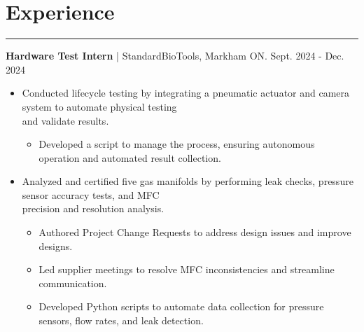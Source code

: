 \documentclass{article}
\begin{document}
\vspace{-0.5cm}     
\section*{\hspace{0.2cm} \large Experience}
\begin{center}
    \vspace{-0.5cm}
    \rule{\textwidth}{0.1pt}
\end{center}

\vspace{0cm}
\textbf{\hspace{-0.10cm} Hardware Test Intern} | StandardBioTools, Markham ON. \hspace {5.2cm} {\small Sept. 2024 - Dec. 2024}

\vspace{-0.2cm}
\begin{itemize}[leftmargin=1.5cm]

    \item {Conducted lifecycle testing by integrating a pneumatic actuator and camera system to automate physical testing \\ and validate results.
    \vspace{-0.2cm}
    \begin{itemize} [label=$\circ$, leftmargin=0.5cm]
        \item {Developed a script to manage the process, ensuring autonomous operation and automated result collection.}
    \end{itemize}
    }


    \vspace{-0.2cm}
    \item Analyzed and certified five gas manifolds by performing leak checks, pressure sensor accuracy tests, and MFC \\ precision and resolution analysis.
    \vspace{-0.2cm}
    \begin{itemize} [label=$\circ$, leftmargin=0.5cm]
        \item Authored Project Change Requests to address design issues and improve designs.
        \item Led supplier meetings to resolve MFC inconsistencies and streamline communication.
        \item Developed Python scripts to automate data collection for pressure sensors, flow rates, and leak detection.

    \end{itemize}
        
    

    
\end{itemize}
\end{document}
